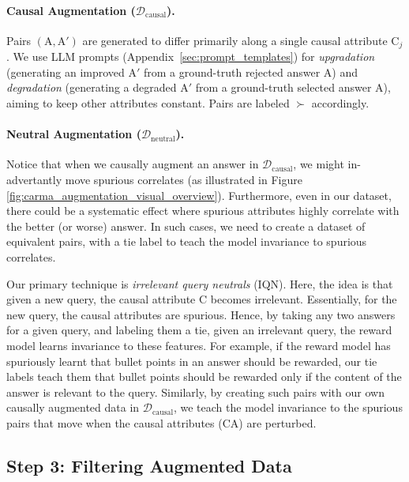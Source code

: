 \paragraph{Causal Augmentation ($\mathcal{D}_{\mathrm{causal}}$).} Pairs $(\mathrm{A}, \mathrm{A}')$ are generated to differ primarily along a single causal attribute $\mathrm{C}_j$. We use LLM prompts (Appendix~\ref{sec:prompt_templates}) for \textit{upgradation} (generating an improved $\mathrm{A}'$ from a ground-truth rejected answer $\mathrm{A}$) and \textit{degradation} (generating a degraded $\mathrm{A}'$ from a ground-truth selected answer $\mathrm{A}$), aiming to keep other attributes constant. Pairs are labeled $\succ$ accordingly.

\paragraph{Neutral Augmentation ($\mathcal{D}_{\mathrm{neutral}}$).} 
Notice that when we causally augment an answer in $\mathcal{D}_{\mathrm{causal}}$, we might in-advertantly move spurious correlates (as illustrated in Figure \ref{fig:carma_augmentation_visual_overview}). Furthermore, even in our dataset, there could be a systematic effect where spurious attributes highly correlate with the better (or worse) answer. In such cases, we need to create a dataset of equivalent pairs, with a tie label to teach the model invariance to spurious correlates.

Our primary technique is \textit{irrelevant query neutrals} (IQN). Here, the idea is that given a new query, the causal attribute $\mathrm{C}$ becomes irrelevant. Essentially, for the new query, the causal attributes are spurious. Hence, by taking any two answers for a given query, and labeling them a tie, given an irrelevant query, the reward model learns invariance to these features. For example, if the reward model has spuriously learnt that bullet points in an answer should be rewarded, our tie labels teach them that bullet points should be rewarded only if the content of the answer is relevant to the query.
Similarly, by creating such pairs with our own causally augmented data in $\mathcal{D}_{\mathrm{causal}}$, we teach the model invariance to the spurious pairs that move when the causal attributes (CA) are perturbed.

\subsection{Step 3: Filtering Augmented Data}
\label{subsec:filtering_appendix} 

